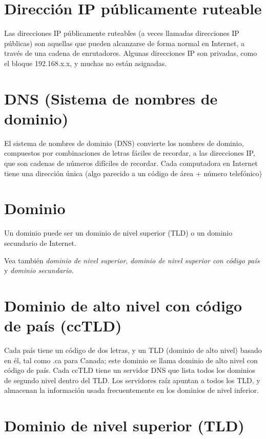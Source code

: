 \documentclass[10pt,a5paper,twoside,,]{book}
\begin{document}
\section{Dirección IP públicamente
ruteable}\label{direcciuxf3n-ip-puxfablicamente-ruteable}

Las direcciones IP públicamente ruteables (a veces llamadas direcciones
IP públicas) son aquellas que pueden alcanzarse de forma normal en
Internet, a través de una cadena de enrutadores. Algunas direcciones IP
son privadas, como el bloque 192.168.x.x, y muchas no están asignadas.

\section{DNS (Sistema de nombres de
dominio)}\label{dns-sistema-de-nombres-de-dominio}

El sistema de nombres de dominio (DNS) convierte los nombres de dominio,
compuestos por combinaciones de letras fáciles de recordar, a las
direcciones IP, que son cadenas de números difíciles de recordar. Cada
computadora en Internet tiene una dirección única (algo parecido a un
código de área + número telefónico)

\section{Dominio}\label{dominio}

Un dominio puede ser un dominio de nivel superior (TLD) o un dominio
secundario de Internet.

Vea también \emph{dominio de nivel superior}, \emph{dominio de nivel
superior con código país} y \emph{dominio secundario}.

\section{Dominio de alto nivel con código de país
(ccTLD)}\label{dominio-de-alto-nivel-con-cuxf3digo-de-pauxeds-cctld}

Cada país tiene un código de dos letras, y un TLD (dominio de alto
nivel) basado en él, tal como .ca para Canada; este dominio se llama
dominio de alto nivel con código de país. Cada ccTLD tiene un servidor
DNS que lista todos los dominios de segundo nivel dentro del TLD. Los
servidores raíz apuntan a todos los TLD, y almacenan la información
usada frecuentemente en los dominios de nivel inferior.

\section{Dominio de nivel superior
(TLD)}\label{dominio-de-nivel-superior-tld}
\end{document}
